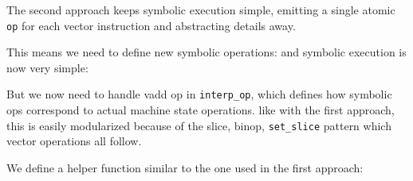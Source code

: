 The second approach keeps symbolic execution simple, emitting a single atomic \verb|op| for each vector instruction and abstracting details away. 

This means we need to define new symbolic operations:
%
%
and symbolic execution is now very simple:

But we now need to handle vadd op in \verb|interp_op|, which defines how symbolic ops correspond to actual machine state operations. like with the first approach, this is easily modularized because of the slice, binop, \verb|set_slice| pattern which vector operations all follow.

We define a helper function similar to the one used in the first approach:
%
%





